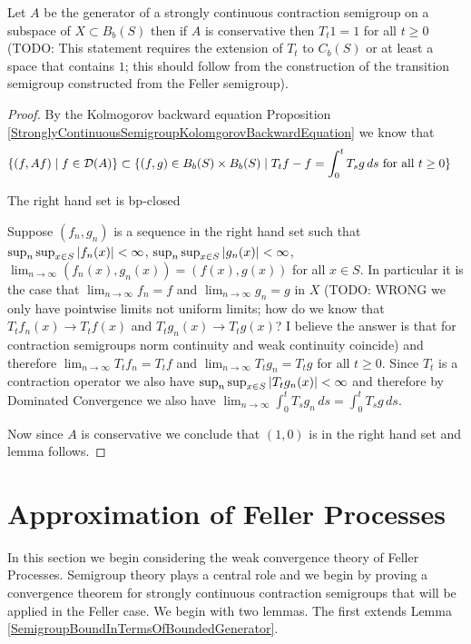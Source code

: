 \begin{lem}Let $A$ be the generator of a strongly continuous contraction semigroup on a subspace of $X \subset B_b(S)$ then if $A$ is conservative then
$T_t 1 = 1$ for all $t \geq 0$ (TODO: This statement requires the extension of $T_t$ to $C_b(S)$ or at least a space that contains $1$; this should follow from the construction of the transition semigroup constructed from the Feller semigroup).
\end{lem}
\begin{proof}
By the Kolmogorov backward equation Proposition \ref{StronglyContinuousSemigroupKolomgorovBackwardEquation} we know that 
\begin{align*}
\lbrace (f, Af) \mid f \in \mathcal{D}(A) \rbrace &\subset \lbrace (f,g) \in B_b(S) \times B_b(S) \mid T_t f- f = \int_0^t T_s g \, ds \text{ for all $t\geq 0$} \rbrace
\end{align*}
\begin{clm}The right hand set is bp-closed
\end{clm}
Suppose $(f_n, g_n)$ is a sequence in the right hand set such that $\sup_n \sup_{x\in S} \left \vert f_n(x) \right \vert < \infty$, $\sup_n \sup_{x\in S} \left \vert g_n(x) \right \vert < \infty$, $\lim_{n \to \infty} (f_n(x), g_n(x)) = (f(x), g(x))$  for all $x \in S$.  In particular it is the case that $\lim_{n \to \infty} f_n = f$ and $\lim_{n \to \infty} g_n = g$ in $X$ (TODO: WRONG we only have pointwise limits not uniform limits; how do we know that $T_t f_n(x) \to T_t f(x)$ and $T_t g_n(x) \to T_t g(x)$?  I believe the answer is that for contraction semigroups norm continuity and weak continuity coincide) and therefore $\lim_{n \to \infty} T_t f_n = T_t f$
and $\lim_{n \to \infty} T_t g_n = T_t g$ for all $t \geq 0$.  Since $T_t$ is a contraction operator we also have $\sup_n \sup_{x \in S} \left \vert T_t g_n(x) \right \vert < \infty$ and therefore by Dominated Convergence we also have $\lim_{n \to \infty} \int_0^t T_s g_n \, ds = \int_0^t T_s g \, ds$.  

Now since $A$ is conservative we conclude that $(1,0)$ is in the right hand set and lemma follows.
\end{proof}

\section{Approximation of Feller Processes}

In this section we begin considering the weak convergence theory of
Feller Processes.  Semigroup theory plays a central role and we begin by proving a convergence
theorem for strongly continuous contraction semigroups that will be applied in the Feller case.  We begin with 
two lemmas. The first extends Lemma \ref{SemigroupBoundInTermsOfBoundedGenerator}.

